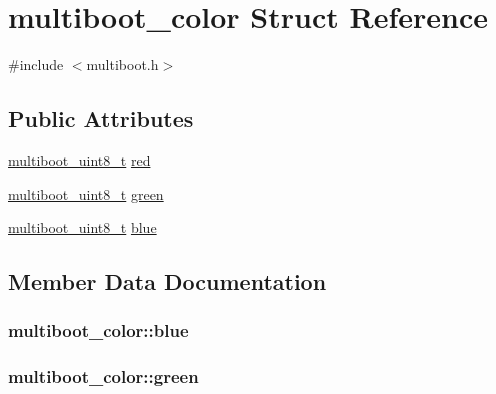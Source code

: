 \hypertarget{structmultiboot__color}{}\section{multiboot\+\_\+color Struct Reference}
\label{structmultiboot__color}


{\ttfamily \#include $<$multiboot.\+h$>$}

\subsection*{Public Attributes}
\begin{DoxyCompactItemize}
\item 
\hyperlink{multiboot_8h_a037f602538fccf97e90021c19fdfc047}{multiboot\+\_\+uint8\+\_\+t} \hyperlink{structmultiboot__color_a4c8a91229f40c06c3c63b4c37e83d219}{red}
\item 
\hyperlink{multiboot_8h_a037f602538fccf97e90021c19fdfc047}{multiboot\+\_\+uint8\+\_\+t} \hyperlink{structmultiboot__color_a08e1c8bc977b39015c9043645e79713d}{green}
\item 
\hyperlink{multiboot_8h_a037f602538fccf97e90021c19fdfc047}{multiboot\+\_\+uint8\+\_\+t} \hyperlink{structmultiboot__color_a6f8d17b0f35ff4cbf9c51dcbc3ea7d01}{blue}
\end{DoxyCompactItemize}


\subsection{Member Data Documentation}
\hypertarget{structmultiboot__color_a6f8d17b0f35ff4cbf9c51dcbc3ea7d01}{}
\subsubsection[{blue}]{ multiboot\+\_\+color\+::blue}\label{structmultiboot__color_a6f8d17b0f35ff4cbf9c51dcbc3ea7d01}
\hypertarget{structmultiboot__color_a08e1c8bc977b39015c9043645e79713d}{}
\subsubsection[{green}]{ multiboot\+\_\+color\+::green}\label{structmultiboot__color_a08e1c8bc977b39015c9043645e79713d}
\hypertarget{structmultiboot__color_a4c8a91229f40c06c3c63b4c37e83d219}{}
